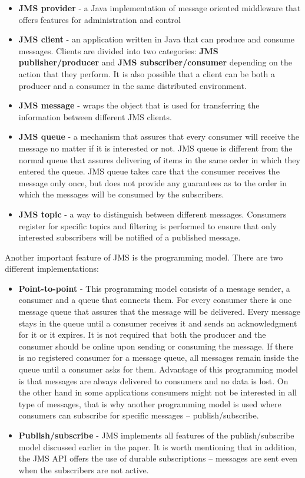 \documentclass{sigplanconf}
\begin{document}
\begin{itemize} \itemsep1pt \parskip0pt 

\item \textbf{JMS provider} - a Java implementation of message oriented middleware that offers features for administration and control
\item \textbf{JMS client} - an application written in Java that can produce and consume messages. Clients are divided into two categories: \textbf{JMS publisher/producer} and \textbf{JMS subscriber/consumer} depending on the action that they perform. It is also possible that a client can be both a producer and a consumer in the same distributed environment.
\item \textbf{JMS message} - wraps the object that is used for transferring the information between different JMS clients.
\item \textbf{JMS queue} - a mechanism that assures that every consumer will receive the message no matter if it is interested or not. JMS queue is different from the normal queue that assures delivering of items in the same order in which they entered the queue. JMS queue takes care that the consumer receives the message only once, but does not provide any guarantees as to the order in which the messages will be consumed by the subscribers.
\item \textbf{JMS topic} - a way to distinguish between different messages. Consumers register for specific topics and  filtering is performed to ensure that only interested subscribers will be notified of a published message.

\end{itemize}

Another important feature of JMS is the programming model. There are two different implementations:

\begin{itemize} \itemsep1pt \parskip0pt 
\item \textbf{Point-to-point} - This programming model consists of a message sender, a consumer and a queue that connects them. For every consumer there is one message queue that assures that the message will be delivered. Every message stays in the queue until a consumer receives it and sends an acknowledgment for it or it expires. It is not required that both the producer and the consumer should be online upon sending or consuming the message. If there is no registered consumer for a message queue, all messages remain inside the queue until a consumer asks for them. Advantage of this programming model is that messages are always delivered to consumers and no data is lost. On the other hand in some applications consumers might not be interested in all type of messages, that is why another programming model is used where consumers can subscribe for specific messages -- publish/subscribe.
\item \textbf{Publish/subscribe} - JMS implements all features of the publish/subscribe model discussed earlier in the paper. It is worth mentioning that in addition, the JMS API offers the use of durable subscriptions – messages are sent even when the subscribers are not active.

\end{itemize}
\end{document}
